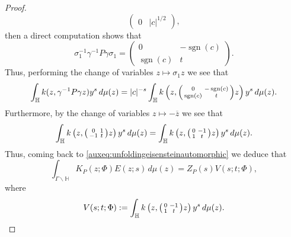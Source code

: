 \documentclass{article}
\theoremstyle{named}
\newcommand{\Hyp}{\mathbb{H}}
\DeclareMathOperator{\sgn}{sgn}
\begin{document}
\begin{proof}
\begin{equation*}
\begin{pmatrix}
 0 & |c|^{1/2}
    \end{pmatrix},
\end{equation*}
then a direct computation shows that 
\begin{equation*}
    \sigma_1^{-1}\gamma^{-1}P\gamma \sigma_1 = \begin{pmatrix}
        0 & -\sgn(c)\\
        \sgn(c) & t
    \end{pmatrix}.
\end{equation*}
Thus, performing the change of variables $z \mapsto \sigma_1 z$ we see that 
\begin{equation*}
\int_\Hyp k(z, \gamma^{-1}P\gamma z) y^s \, d\mu(z)  = |c|^{-s} \int_\Hyp k\left(z, \begin{psmallmatrix}
    0 & -\sgn(c)\\
    \sgn(c) & t
\end{psmallmatrix}z\right) y^s \, d\mu(z).
\end{equation*}
Furthermore, by the change of variables $z \mapsto -\overline{z}$ we see that 
\begin{equation*}
    \int_\Hyp k\left(z, \begin{psmallmatrix}
    0 & 1\\
    -1 & t
\end{psmallmatrix}z\right) y^s \, d\mu(z) =\int_\Hyp k\left(z, \begin{psmallmatrix}
    0 & -1\\
    1 & t
\end{psmallmatrix}z\right) y^s \, d\mu(z).
\end{equation*}
Thus, coming back to \eqref{auxeq:unfoldingeisensteinautomorphic} we deduce that 
\begin{equation}\label{eq:expressioninnerproductautomorphiceisenstein}
\int_{\Gamma\backslash \Hyp} K_P(z; \Phi)E(z; s)\, d\mu(z) = Z_P(s)V(s; t; \Phi),
\end{equation}
where 
\begin{equation*}
    V(s;t; \Phi) := \int_\Hyp k\left(z, \begin{psmallmatrix}
    0 & -1\\
    1 & t
\end{psmallmatrix}z\right) y^s \, d\mu(z).
\end{equation*}


\end{proof}
\end{document}
